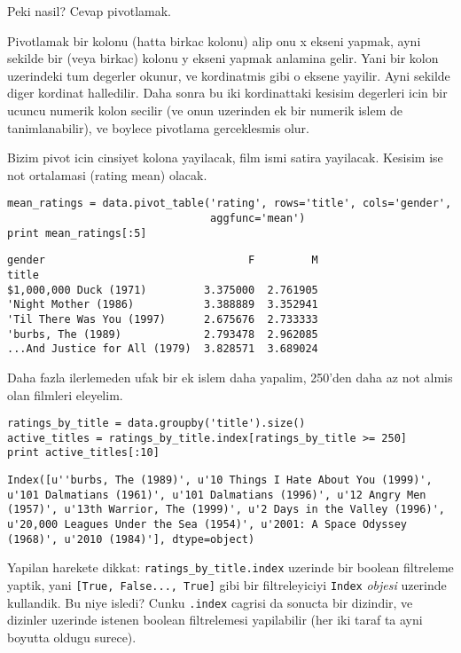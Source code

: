 \documentclass[12pt,fleqn]{article}\usepackage{../common}
\begin{document}
Peki nasil? Cevap pivotlamak.

Pivotlamak bir kolonu (hatta birkac kolonu) alip onu x ekseni yapmak,
ayni sekilde bir (veya birkac) kolonu y ekseni yapmak anlamina
gelir. Yani bir kolon uzerindeki tum degerler okunur, ve kordinatmis
gibi o eksene yayilir. Ayni sekilde diger kordinat halledilir. Daha
sonra bu iki kordinattaki kesisim degerleri icin bir ucuncu numerik
kolon secilir (ve onun uzerinden ek bir numerik islem de
tanimlanabilir), ve boylece pivotlama gerceklesmis olur.

Bizim pivot icin cinsiyet kolona yayilacak, film ismi satira
yayilacak. Kesisim ise not ortalamasi (rating mean) olacak.

\begin{verbatim}
mean_ratings = data.pivot_table('rating', rows='title', cols='gender',
                                aggfunc='mean')
print mean_ratings[:5]
\end{verbatim}

\begin{verbatim}
gender                                F         M
title                                            
$1,000,000 Duck (1971)         3.375000  2.761905
'Night Mother (1986)           3.388889  3.352941
'Til There Was You (1997)      2.675676  2.733333
'burbs, The (1989)             2.793478  2.962085
...And Justice for All (1979)  3.828571  3.689024
\end{verbatim}

Daha fazla ilerlemeden ufak bir ek islem daha yapalim, 250'den daha az
not almis olan filmleri eleyelim.

\begin{verbatim}
ratings_by_title = data.groupby('title').size()
active_titles = ratings_by_title.index[ratings_by_title >= 250]
print active_titles[:10]
\end{verbatim}

\begin{verbatim}
Index([u''burbs, The (1989)', u'10 Things I Hate About You (1999)', u'101 Dalmatians (1961)', u'101 Dalmatians (1996)', u'12 Angry Men (1957)', u'13th Warrior, The (1999)', u'2 Days in the Valley (1996)', u'20,000 Leagues Under the Sea (1954)', u'2001: A Space Odyssey (1968)', u'2010 (1984)'], dtype=object)
\end{verbatim}

Yapilan harekete dikkat: \verb!ratings_by_title.index! uzerinde bir boolean
filtreleme yaptik, yani \verb![True, False..., True]!  gibi bir
filtreleyiciyi \verb!Index! {\em objesi} uzerinde kullandik. Bu niye
isledi? Cunku \verb!.index! cagrisi da sonucta bir dizindir, ve dizinler
uzerinde istenen boolean filtrelemesi yapilabilir (her iki taraf ta ayni
boyutta oldugu surece).
\end{document}
